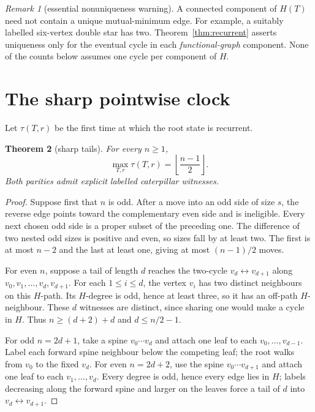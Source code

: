 \documentclass[a4paper,10pt]{amsart}
\newtheorem{theorem}{Theorem}[section]
\theoremstyle{remark}
\newtheorem{remark}[theorem]{Remark}
\begin{document}
\begin{remark}[essential nonuniqueness warning]\label{rem:warning}
A connected component of $H(T)$ need not contain a unique mutual-minimum
edge.  For example, a suitably labelled six-vertex double star has two.
Theorem~\ref{thm:recurrent} asserts uniqueness only for the eventual cycle in
each \emph{functional-graph} component.  None of the counts below assumes
one cycle per component of $H$.
\end{remark}

\section{The sharp pointwise clock}

Let $\tau(T,r)$ be the first time at which the root state is recurrent.

\begin{theorem}[sharp tails]\label{thm:tail}
For every $n\ge1$,
\begin{equation}\label{eq:max-tail}
 \max_{T,r}\tau(T,r)=\left\lfloor\frac{n-1}{2}\right\rfloor.
\end{equation}
Both parities admit explicit labelled caterpillar witnesses.
\end{theorem}

\begin{proof}
Suppose first that $n$ is odd.  After a move into an odd side of size $s$,
the reverse edge points toward the complementary even side and is
ineligible.  Every next chosen odd side is a proper subset of the preceding
one.  The difference of two nested odd sizes is positive and even, so sizes
fall by at least two.  The first is at most $n-2$ and the last at least one,
giving at most $(n-1)/2$ moves.

For even $n$, suppose a tail of length $d$ reaches the two-cycle
$v_d\leftrightarrow v_{d+1}$ along
$v_0,v_1,\ldots,v_d,v_{d+1}$.  For each $1\le i\le d$, the vertex $v_i$
has two distinct neighbours on this $H$-path.  Its $H$-degree is odd, hence
at least three, so it has an off-path $H$-neighbour.  These $d$ witnesses are
distinct, since sharing one would make a cycle in $H$.  Thus
$n\ge(d+2)+d$ and $d\le n/2-1$.

For odd $n=2d+1$, take a spine $v_0\cdots v_d$ and attach one leaf to each
$v_0,\ldots,v_{d-1}$.  Label each forward spine neighbour below the competing
leaf; the root walks from $v_0$ to the fixed $v_d$.  For even $n=2d+2$, use
the spine $v_0\cdots v_{d+1}$ and attach one leaf to each
$v_1,\ldots,v_d$.  Every degree is odd, hence every edge lies in $H$; labels
decreasing along the forward spine and larger on the leaves force a tail of
$d$ into $v_d\leftrightarrow v_{d+1}$.
\end{proof}
\end{document}
